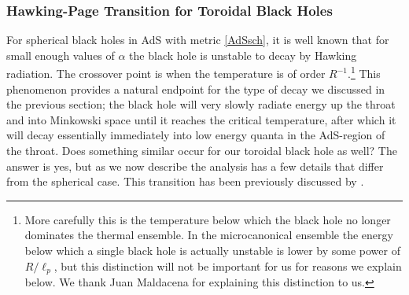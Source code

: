 \documentclass[12pt]{article}
\begin{document}
\subsubsection{Hawking-Page Transition for Toroidal Black Holes}
For spherical black holes in AdS with metric \eqref{AdSsch}, it is well known \cite{Hawking:1982dh,Witten:1998zw} that for small enough values of $\alpha$ the black hole is unstable to decay by Hawking radiation.  The crossover point is when the temperature is of order  $R^{-1}$.\footnote{More carefully this is the temperature below which the black hole no longer dominates the thermal ensemble.  In the microcanonical ensemble the energy below which a single black hole is actually unstable is lower by some power of $R/\ell_p$, but this distinction will not be important for us for reasons we explain below.  We thank Juan Maldacena for explaining this distinction to us.}  This phenomenon provides a natural endpoint for the type of decay we discussed in the previous section; the black hole will very slowly radiate energy up the throat and into Minkowski space until it reaches the critical temperature, after which it will decay essentially immediately into low energy quanta in the AdS-region of the throat.  Does something similar occur for our toroidal black hole as well?  The answer is yes, but as we now describe the analysis has a few details that differ from the spherical case.  This transition has been previously discussed by \cite{Nishioka:2009zj}.
\end{document}

